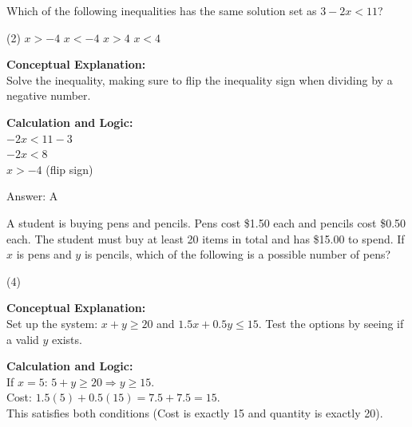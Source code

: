 \documentclass[11pt,paper=a4,answers]{exam}
\begin{document}
\begin{questions}
\vspace{20pt}

\question
Which of the following inequalities has the same solution set as $3 - 2x < 11$?
\begin{tasks}(2)
    \task $x > -4$
    \task $x < -4$
    \task $x > 4$
    \task $x < 4$
\end{tasks}

\begin{solution}
\textbf{Conceptual Explanation:} \\
Solve the inequality, making sure to flip the inequality sign when dividing by a negative number.

\vspace{10pt}
\textbf{Calculation and Logic:} \\
$-2x < 11 - 3$ \\
$-2x < 8$ \\
$x > -4$ (flip sign)

\vspace{15pt}
Answer: \colorbox{yellow!100}{A}
\end{solution}

\vspace{20pt}

\question
A student is buying pens and pencils. Pens cost \$1.50 each and pencils cost \$0.50 each. The student must buy at least 20 items in total and has \$15.00 to spend. If $x$ is pens and $y$ is pencils, which of the following is a possible number of pens?
\begin{tasks}(4)
\end{tasks}

\begin{solution}
\textbf{Conceptual Explanation:} \\
Set up the system: $x + y \ge 20$ and $1.5x + 0.5y \le 15$. Test the options by seeing if a valid $y$ exists.

\vspace{10pt}
\textbf{Calculation and Logic:} \\
If $x = 5$: $5 + y \ge 20 \Rightarrow y \ge 15$. \\
Cost: $1.5(5) + 0.5(15) = 7.5 + 7.5 = 15$. \\
This satisfies both conditions (Cost is exactly 15 and quantity is exactly 20).


\end{solution}
\end{questions}
\end{document}
